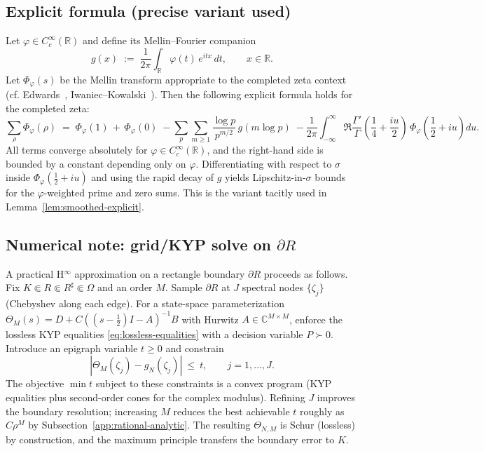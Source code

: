 \documentclass[11pt]{article}
\theoremstyle{definition}
\theoremstyle{remark}
\newcommand{\C}{\mathbb{C}}
\newcommand{\R}{\mathbb{R}}
\begin{document}
\subsection{Explicit formula (precise variant used)}\label{app:explicit-formula}
Let \(\varphi\in C_c^{\infty}(\R)\) and define its Mellin--Fourier companion
\[
 g(x)\;:=\;\frac{1}{2\pi}\int_{\R} \varphi(t)\,e^{itx}\,dt,\qquad x\in\R.
\]
Let \(\Phi_{\varphi}(s)\) be the Mellin transform appropriate to the completed zeta context (cf. Edwards~\cite[Ch.~1, §5]{Edwards}, Iwaniec--Kowalski~\cite[Ch.~5]{IwaniecKowalski}). Then the following explicit formula holds for the completed zeta:
\[
 \sum_{\rho} \Phi_{\varphi}(\rho)\;=\;\Phi_{\varphi}(1)\,+\,\Phi_{\varphi}(0)\;-
 \sum_{p}\sum_{m\ge 1} \frac{\log p}{p^{m/2}}\,g(m\log p)\;-
 \frac{1}{2\pi}\int_{-\infty}^{\infty} \Re\frac{\Gamma'}{\Gamma}\!\left(\frac{1}{4}+\frac{iu}{2}\right)\,\Phi_{\varphi}\!\left(\frac12+iu\right)du.
\]
All terms converge absolutely for \(\varphi\in C_c^{\infty}(\R)\), and the right-hand side is bounded by a constant depending only on \(\varphi\). Differentiating with respect to \(\sigma\) inside \(\Phi_{\varphi}(\tfrac12+iu)\) and using the rapid decay of \(g\) yields Lipschitz-in-\(\sigma\) bounds for the \(\varphi\)-weighted prime and zero sums. This is the variant tacitly used in Lemma~\ref{lem:smoothed-explicit}.
\subsection{Numerical note: grid/KYP solve on \(\partial R\)}\label{app:numerics}
A practical H$^\infty$ approximation on a rectangle boundary \(\partial R\) proceeds as follows. Fix \(K\Subset R\Subset R^\sharp\Subset\Omega\) and an order \(M\). Sample \(\partial R\) at \(J\) spectral nodes \(\{\zeta_j\}\) (Chebyshev along each edge). For a state-space parameterization \(\Theta_M(s)=D+C((s-\tfrac12)I-A)^{-1}B\) with Hurwitz \(A\in\C^{M\times M}\), enforce the lossless KYP equalities \eqref{eq:lossless-equalities} with a decision variable \(P\succ 0\). Introduce an epigraph variable \(t\ge 0\) and constrain
\[
 |\Theta_M(\zeta_j)-g_N(\zeta_j)|\ \le\ t,\qquad j=1,\dots,J.
\]
The objective \(\min t\) subject to these constraints is a convex program (KYP equalities plus second-order cones for the complex modulus). Refining \(J\) improves the boundary resolution; increasing \(M\) reduces the best achievable \(t\) roughly as \(C\rho^M\) by Subsection~\ref{app:rational-analytic}. The resulting \(\Theta_{N,M}\) is Schur (lossless) by construction, and the maximum principle transfers the boundary error to \(K\).
\end{document}
